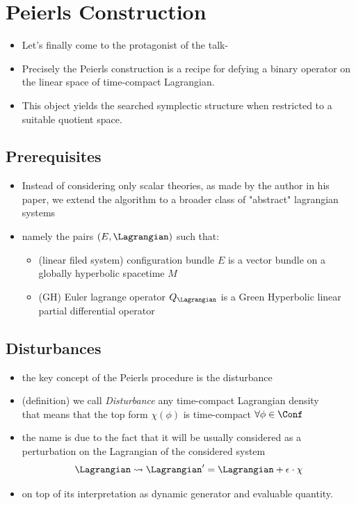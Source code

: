 \documentclass[a4paper,11pt]{scrartcl}
\begin{document}
    \section{Peierls Construction}
    \begin{itemize}
        \item Let's finally come to the protagonist of the talk-
        \item Precisely the Peierls construction is a recipe for defying a binary operator on the linear space of time-compact Lagrangian.
        \item This object yields the searched symplectic structure when restricted to a suitable quotient space.
    \end{itemize}
    \subsection{Prerequisites}
    \begin{itemize}
        \item Instead of considering only scalar theories, as made by the author in his paper, we extend the algorithm to a broader class of "abstract" lagrangian systems
        \item namely the pairs $(E,\Lagrangian)$ such that:
        \begin{itemize}
            \item (linear filed system) configuration bundle $E$ is a vector bundle on a globally hyperbolic spacetime $M$
            \item (GH) Euler lagrange operator $Q_\Lagrangian$ is a Green Hyperbolic linear partial differential operator
        \end{itemize}
    \end{itemize}
    \subsection{Disturbances}
    \begin{itemize}
        \item the key concept of the Peierls procedure is the disturbance
        \item (definition) we call \emph{Disturbance} any time-compact Lagrangian density\\
        that means that the top form $\chi(\phi) $ is time-compact $\forall \phi \in \Conf$
        \item the name is due to the fact that it will be usually considered as a perturbation on the Lagrangian of the considered system
        $$ \Lagrangian \rightsquigarrow \Lagrangian' = \Lagrangian + \epsilon\cdot \chi$$
        \item on top of its interpretation as dynamic generator and evaluable quantity.
    \end{itemize}
\end{document}
